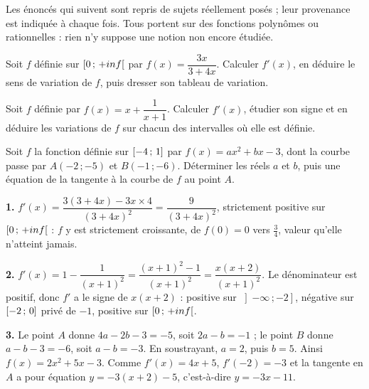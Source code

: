 \begin{annales}
Les énoncés qui suivent sont repris de sujets réellement posés ; leur
provenance est indiquée à chaque fois. Tous portent sur des fonctions
polynômes ou rationnelles : rien n'y suppose une notion non encore étudiée.

Soit $f$ définie sur $\left[0\,;\,+inf\right[$ par
$f(x) = \dfrac{3x}{3+4x}$. Calculer $f'(x)$, en déduire le sens de variation
de $f$, puis dresser son tableau de variation.

Soit $f$ définie par $f(x) = x+\dfrac{1}{x+1}$. Calculer $f'(x)$, étudier son
signe et en déduire les variations de $f$ sur chacun des intervalles où elle
est définie.

Soit $f$ la fonction définie sur $\left[-4\,;\,1\right]$ par
$f(x) = ax^{2}+bx-3$, dont la courbe passe par $A(-2\,;-5)$ et
$B(-1\,;-6)$. Déterminer les réels $a$ et $b$, puis une équation de la
tangente à la courbe de $f$ au point $A$.
\end{annales}

\begin{corrige}[annales]
\textbf{1.} $f'(x) = \dfrac{3(3+4x)-3x \times 4}{(3+4x)^{2}}
= \dfrac{9}{(3+4x)^{2}}$, strictement positive sur
$\left[0\,;\,+inf\right[$ : $f$ y est strictement croissante, de
$f(0) = 0$ vers $\frac34$, valeur qu'elle n'atteint jamais.

\textbf{2.} $f'(x) = 1-\dfrac{1}{(x+1)^{2}}
= \dfrac{(x+1)^{2}-1}{(x+1)^{2}} = \dfrac{x(x+2)}{(x+1)^{2}}$. Le
dénominateur est positif, donc $f'$ a le signe de $x(x+2)$ : positive sur
$\left]-\infty\,;-2\right]$, négative sur $\left[-2\,;\,0\right]$ privé de
$-1$, positive sur $\left[0\,;\,+inf\right[$.

\textbf{3.} Le point $A$ donne $4a-2b-3 = -5$, soit $2a-b = -1$ ; le point
$B$ donne $a-b-3 = -6$, soit $a-b = -3$. En soustrayant, $a = 2$, puis
$b = 5$. Ainsi $f(x) = 2x^{2}+5x-3$. Comme $f'(x) = 4x+5$, $f'(-2) = -3$ et
la tangente en $A$ a pour équation $y = -3\left(x+2\right)-5$, c'est-à-dire
$y = -3x-11$.
\end{corrige}

